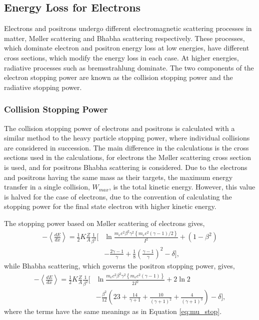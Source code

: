 \subsection{Energy Loss for Electrons}
Electrons and positrons undergo different electromagnetic scattering processes
in matter, M{\o}ller scattering and Bhabha scattering 
respectively\cite{10.2307/96528, 10.2307/96479}. These processes, which 
dominate electron and positron energy loss at low energies, have different 
cross sections, which modify the energy loss in each case. At higher energies, 
radiative processes such as bremsstrahlung dominate. The two components of the 
electron stopping power are known as the collision stopping power and the 
radiative stopping power.

\subsubsection*{Collision Stopping Power}
The collision stopping power of electrons and positrons is calculated with a
similar method to the heavy particle stopping power, where individual collisions
are considered in succession. The main difference in the calculations is the
cross sections used in the calculations, for electrons the M{\o}ller scattering
cross section is used, and for positrons Bhabha scattering is considered. Due to
the electrons and positrons having the same mass as their targets, the maximum 
energy transfer in a single collision, $W_{max}$, is the total kinetic energy. 
However, this value is halved for the case of electrons, due to the convention 
of calculating the stopping power for the final state electron with higher 
kinetic energy.

The stopping power based on M{\o}ller scattering of electrons gives,
\begin{align*}
	- \left< \frac{dE}{dx} \right> = \frac{1}{2} K \frac{Z}{A} \frac{1}{\beta^2}
	\bigg[ &\ln \frac{m_e c^2 \beta^2 \gamma^2 \left\{ m_e c^2 (\gamma - 1) / 2
	\right\} }{I^2} + (1 - \beta^2) \\
	&- \frac{2\gamma - 1}{\gamma} + \frac{1}{8} 
	\left(\frac{\gamma - 1}{\gamma}\right)^2 - \delta \bigg],
\end{align*}
while Bhabha scattering, which governs the positron stopping power, gives,
\begin{align*}
	- \left< \frac{dE}{dx} \right> = \frac{1}{2} K \frac{Z}{A} \frac{1}{\beta^2}
	\bigg[ &\ln \frac{m_e c^2 \beta^2 \gamma^2 \left\{ m_e c^2 (\gamma - 1) 
	\right\} }{2 I^2} 
	+ 2 \ln 2  \\ &-\frac{\beta^2}{12} \left(23 + \frac{14}{\gamma + 1} +
	\frac{10}{(\gamma + 1)^2} + \frac{4}{(\gamma + 1)^3}\right) - \delta \bigg],
\end{align*}
where the terms have the same meanings as in Equation 
\ref{eq:mu_stop}\cite{PhysRevD.98.030001}.

